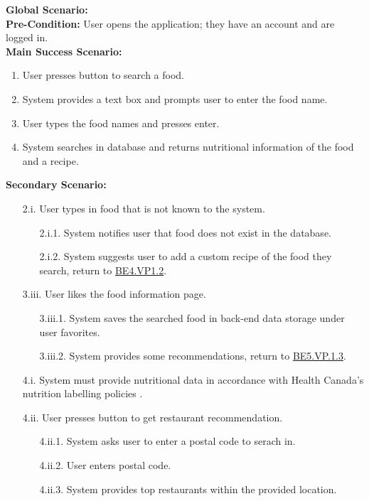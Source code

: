 \documentclass[]{article}
\begin{document}
\begin{enumerate}[{\bf BE1.}]
		{\bf Global Scenario:} \\
		\textbf{Pre-Condition:} User opens the application; they have an account and are logged in. \\
		\textbf{Main Success Scenario:} 
		\begin{enumerate}[{1.}]
			\item User presses button to search a food.
			\item System provides a text box and prompts user to enter the food name.
			\item User types the food names and presses enter.
			\item System searches in database and returns nutritional information of the food and a recipe.
		\end{enumerate}
		\textbf{Secondary Scenario:}
		\begin{enumerate}
			\item[2.i.] User types in food that is not known to the system.
			\begin{enumerate}
				\item[2.i.1.] System notifies user that food does not exist in the database.
				\item[2.i.2.] System suggests user to add a custom recipe of the food they search, return to \hyperlink{BE4.VP1.2}{BE4.VP1.2}.
			\end{enumerate}
			\item[3.iii.] User likes the food information page.
				\begin{enumerate}
					\item[3.iii.1.] System saves the searched food in back-end data storage under user favorites.
					\item[3.iii.2.] System provides some recommendations, return to \hyperlink{BE5.VP.1.3}{BE5.VP.1.3}.
				\end{enumerate}
			\item[4.i.] System must provide nutritional data in accordance with Health Canada's nutrition labelling policies \cite{CanadaNutrition}.
			\item[4.ii.] User presses button to get restaurant recommendation.
				\begin{enumerate}
					\item[4.ii.1.] System asks user to enter a postal code to serach in.
					\item[4.ii.2.] User enters postal code.
					\item[4.ii.3.] System provides top restaurants within the provided location.
				\end{enumerate}
		\end{enumerate}


\end{enumerate}
\end{document}
